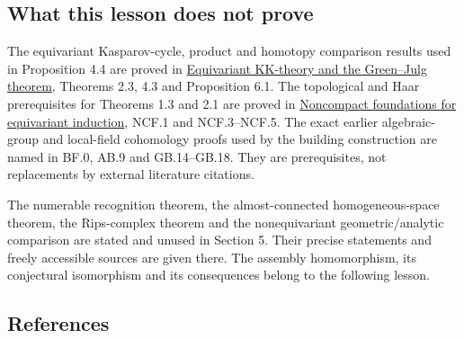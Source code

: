 \documentclass[
  11pt,
]{article}
\begin{document}
\subsection{What this lesson does not
prove}\label{what-this-lesson-does-not-prove}

The equivariant Kasparov-cycle, product and homotopy comparison results
used in Proposition 4.4 are proved in \href{KT-KK-17.html}{Equivariant
KK-theory and the Green--Julg theorem}, Theorems 2.3, 4.3 and
Proposition 6.1. The topological and Haar prerequisites for Theorems 1.3
and 2.1 are proved in
\href{supporting/noncompact-foundations/noncompact-foundations.html}{Noncompact
foundations for equivariant induction}, NCF.1 and NCF.3--NCF.5. The
exact earlier algebraic-group and local-field cohomology proofs used by
the building construction are named in BF.0, AB.9 and GB.14--GB.18. They
are prerequisites, not replacements by external literature citations.

The numerable recognition theorem, the almost-connected
homogeneous-space theorem, the Rips-complex theorem and the
nonequivariant geometric/analytic comparison are stated and unused in
Section 5. Their precise statements and freely accessible sources are
given there. The assembly homomorphism, its conjectural isomorphism and
its consequences belong to the following lesson.

\subsection{References}\label{references}
\end{document}
